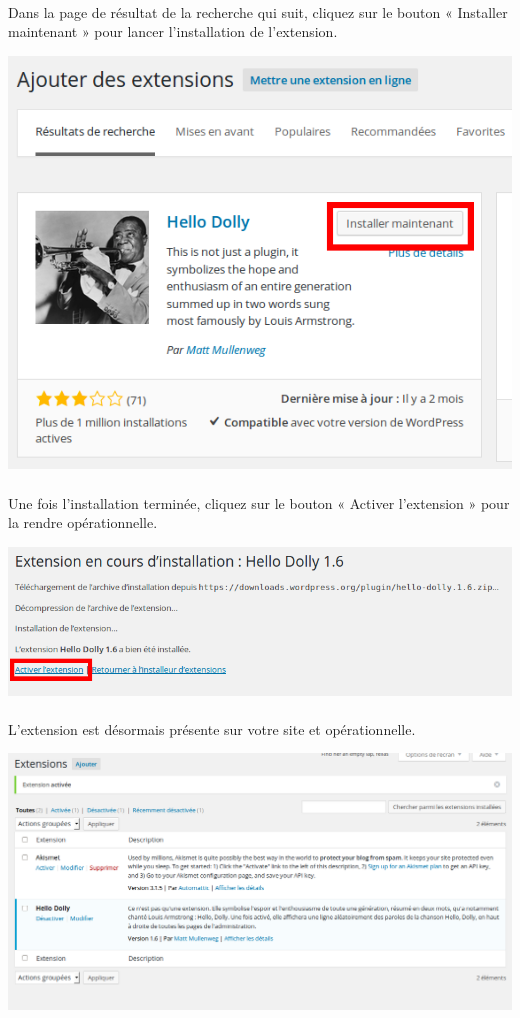 \documentclass[10pt,a4paper]{article}
\begin{document}
\paragraph{}Dans la page de résultat de la recherche qui suit, cliquez sur le bouton « Installer maintenant » pour lancer l'installation de l'extension.
\begin{center}
\includegraphics[scale=0.3]{img/0172.png}
\end{center}
\paragraph{}Une fois l'installation terminée, cliquez sur le bouton « Activer l'extension » pour la rendre opérationnelle.
\begin{center}
\includegraphics[scale=0.3]{img/0173.png}
\end{center}
\paragraph{}L'extension est désormais présente sur votre site et opérationnelle.
\begin{center}
\includegraphics[scale=0.3]{img/0174.png}
\end{center}
\newpage
\end{document}
